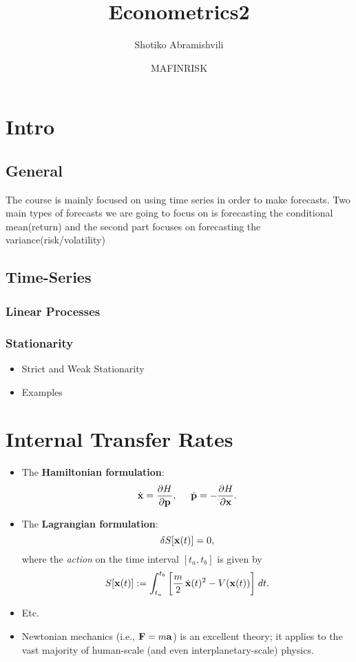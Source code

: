 \documentclass[10pt, oneside]{article}
\title{Econometrics2}
\author{Shotiko Abramishvili}
\date{MAFINRISK}
\begin{document}
\maketitle
\tableofcontents

\vspace{.25in}

\section{Intro}
\subsection{General}
The course is mainly focused on using time series in order to make forecasts. Two main types of forecasts we are going to focus on is forecasting the conditional mean(return) and the second part focuses on forecasting the variance(risk/volatility)
\subsection{Time-Series}
\subsubsection{Linear Processes}
\subsubsection{Stationarity}
\begin{itemize}
\item{Strict and Weak Stationarity}
\item{Examples}
\end{itemize}




\section{Internal Transfer Rates}

\begin{itemize}

\item The {\bf Hamiltonian formulation}:
\[ \dot{{\bf x}} = \frac{\partial H}{\partial {\bf p}}, \;\;\;\;\; \dot{{\bf p}} = - \frac{\partial H}{\partial {\bf x}}. \]

\item The {\bf Lagrangian formulation}:
\[ \delta S[{\bf x}(t)] = 0, \]
where the {\em action} on the time interval $[t_a, t_b]$ is given by
\[ S[{\bf x}(t)] := \int_{t_a}^{t_b} \bigg[ \frac{m}{2} \, \dot{{\bf x}}(t)^2 - V({\bf x}(t)) \bigg]  \; dt. \]

\item Etc.

\end{itemize}

\begin{itemize}

\item Newtonian mechanics (i.e., ${\bf F} = m{\bf a}$) is an excellent theory; it applies to the vast majority of human-scale (and even interplanetary-scale) physics. 
\end{itemize}
\end{document}
